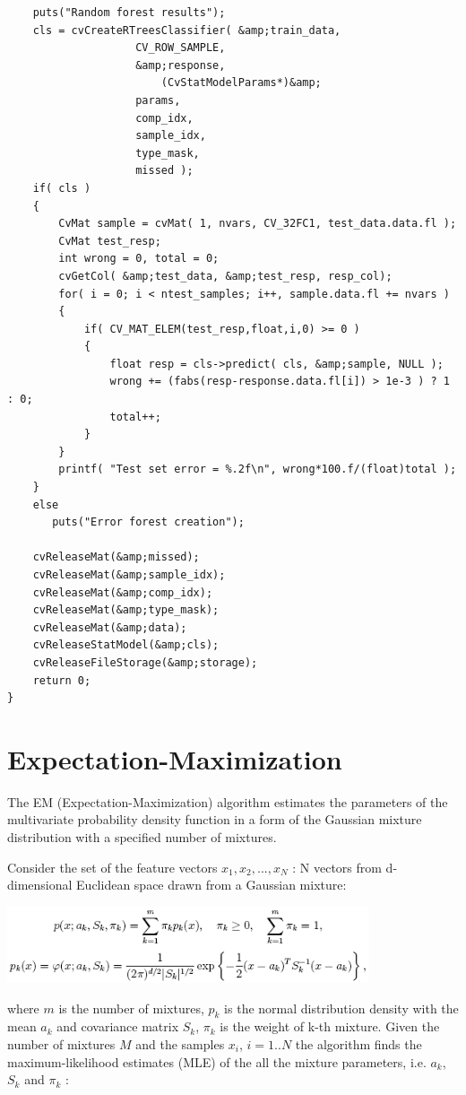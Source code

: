 \begin{lstlisting}
    puts("Random forest results");
    cls = cvCreateRTreesClassifier( &amp;train_data, 
				    CV_ROW_SAMPLE, 
				    &amp;response,
        			    (CvStatModelParams*)&amp; 
				    params, 
				    comp_idx, 
				    sample_idx, 
				    type_mask, 
				    missed );
    if( cls )
    {
        CvMat sample = cvMat( 1, nvars, CV_32FC1, test_data.data.fl );
        CvMat test_resp;
        int wrong = 0, total = 0;
        cvGetCol( &amp;test_data, &amp;test_resp, resp_col);
        for( i = 0; i < ntest_samples; i++, sample.data.fl += nvars )
        {
            if( CV_MAT_ELEM(test_resp,float,i,0) >= 0 )
            {
                float resp = cls->predict( cls, &amp;sample, NULL );
                wrong += (fabs(resp-response.data.fl[i]) > 1e-3 ) ? 1 : 0;
                total++;
            }
        }
        printf( "Test set error = %.2f\n", wrong*100.f/(float)total );
    }
    else
       puts("Error forest creation");

    cvReleaseMat(&amp;missed);
    cvReleaseMat(&amp;sample_idx);
    cvReleaseMat(&amp;comp_idx);
    cvReleaseMat(&amp;type_mask);
    cvReleaseMat(&amp;data);
    cvReleaseStatModel(&amp;cls);
    cvReleaseFileStorage(&amp;storage);
    return 0;
}
\end{lstlisting}

\section{Expectation-Maximization}

The EM (Expectation-Maximization) algorithm estimates the parameters of the multivariate probability density function in a form of the Gaussian mixture distribution with a specified number of mixtures.

Consider the set of the feature vectors $x_1, x_2,...,x_{N}$ : N vectors from d-dimensional Euclidean space drawn from a Gaussian mixture:

\includegraphics[width=0.8\textwidth]{pics/em1.png}

where $m$ is the number of mixtures, $p_k$ is the normal distribution
density with the mean $a_k$ and covariance matrix $S_k$, $\pi_k$
is the weight of k-th mixture. Given the number of mixtures
$M$ and the samples $x_i$, $i=1..N$ the algorithm finds the
maximum-likelihood estimates (MLE) of the all the mixture parameters,
i.e. $a_k$, $S_k$ and $\pi_k$ :

